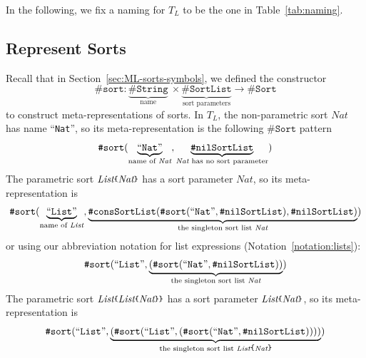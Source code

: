 \documentclass[UTF8,11pt]{article}
\theoremstyle{plain}
\theoremstyle{definition}
\theoremstyle{remark}
\newcommand{\Nat}{\textit{Nat}}
\newcommand{\List}{\textit{List}}
\newcommand{\parametric}[2]{{#1}\raisebox{.2ex}{\texttt{\footnotesize{\{}}}#2\raisebox{.2ex}{\texttt{\footnotesize{\}}}}}
\newcommand{\sharpsymbol}{\#}
\newcommand{\KString}{\texttt{\sharpsymbol String}}
\newcommand{\KSort}{\texttt{\sharpsymbol Sort}}
\newcommand{\Ksort}{\texttt{\sharpsymbol sort}}
\newcommand{\KSortList}{\texttt{\sharpsymbol SortList}}
\newcommand{\KnilKSortList}{\texttt{\sharpsymbol nilSortList}}
\newcommand{\KconsKSortList}{\texttt{\sharpsymbol consSortList}}
\newcommand{\qquottt}[1]{\textrm{``\texttt{#1}''}}
\begin{document}
In the following, we fix a naming for $T_L$ to be the one in 
Table~\ref{tab:naming}.

\subsection{Represent Sorts}
Recall that in Section~\ref{sec:ML-sorts-symbols}, we defined the constructor
$$
\Ksort \colon \underbrace{\KString}_\text{name}\  \times 
\underbrace{\KSortList}_\text{sort parameters} \to \KSort
$$
to construct meta-representations of sorts.
In $T_L$, the non-parametric sort $\Nat$ has name \qquottt{Nat},
so its meta-representation is the following $\KSort$ pattern
$$
\Ksort(
	\underbrace{\qquottt{Nat}}_\text{name of $\Nat$}, 
	\underbrace{\KnilKSortList}_\text{$\Nat$ has no sort parameter})
$$
The parametric sort $\parametric{\List}{\Nat}$ has a sort parameter $\Nat$, so 
its meta-representation is
$$
\Ksort(
	\underbrace{
		\qquottt{List}}_
		\text{name of $\List$}, 
	\underbrace{
		\KconsKSortList(\Ksort(\qquottt{Nat}, \KnilKSortList),\KnilKSortList)}_
		\text{the singleton sort list $\Nat$})
$$
or using our abbreviation notation for list expressions 
(Notation~\ref{notation:lists}):
$$
	\Ksort(
		\qquottt{List}, 
		\underbrace{(\Ksort(\qquottt{Nat},\KnilKSortList))}_
			\text{the singleton sort list $\Nat$})
$$
The parametric sort $\parametric{\List}{\parametric{\List}{\Nat}}$ has a sort 
parameter $\parametric{\List}{\Nat}$, so its 
meta-representation is
$$ \Ksort(\qquottt{List}, \underbrace{(\Ksort(\qquottt{List}, 
(\Ksort(\qquottt{Nat},\KnilKSortList))))}_
	\text{the singleton sort list $\parametric{\List}{\Nat}$})$$
\end{document}
